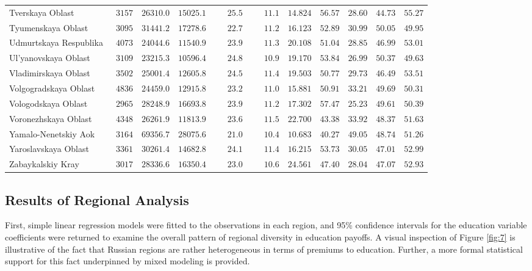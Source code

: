 \documentclass[12pt,a4paper]{article}
\numberwithin{equation}{section}
\begin{document}
{\begin{longtable}{lcccccccccc}
		Tverskaya Oblast  & $\phantom{0}3157$ & $26310.0$ & $15025.1$ & $\phantom{000}25.5$ & $\phantom{000}11.1$ & $14.824$ & $56.57$ & $28.60$ & $44.73$ & $55.27$ \\
		Tyumenskaya Oblast  & $\phantom{0}3095$ & $31441.2$ & $17278.6$ & $\phantom{000}22.7$ & $\phantom{000}11.2$ & $16.123$ & $52.89$ & $30.99$ & $50.05$ & $49.95$ \\
		Udmurtskaya Respublika  & $\phantom{0}4073$ & $24044.6$ & $11540.9$ & $\phantom{000}23.9$ & $\phantom{000}11.3$ & $20.108$ & $51.04$ & $28.85$ & $46.99$ & $53.01$ \\
		Ul'yanovskaya Oblast  & $\phantom{0}3109$ & $23215.3$ & $10596.4$ & $\phantom{000}24.8$ & $\phantom{000}10.9$ & $19.170$ & $53.84$ & $26.99$ & $50.37$ & $49.63$ \\
		Vladimirskaya Oblast  & $\phantom{0}3502$ & $25001.4$ & $12605.8$ & $\phantom{000}24.5$ & $\phantom{000}11.4$ & $19.503$ & $50.77$ & $29.73$ & $46.49$ & $53.51$ \\
		Volgogradskaya Oblast  & $\phantom{0}4836$ & $24459.0$ & $12915.8$ & $\phantom{000}23.2$ & $\phantom{000}11.0$ & $15.881$ & $50.91$ & $33.21$ & $49.69$ & $50.31$ \\
		Vologodskaya Oblast  & $\phantom{0}2965$ & $28248.9$ & $16693.8$ & $\phantom{000}23.9$ & $\phantom{000}11.2$ & $17.302$ & $57.47$ & $25.23$ & $49.61$ & $50.39$ \\
		Voronezhskaya Oblast  & $\phantom{0}4348$ & $26261.9$ & $11813.9$ & $\phantom{000}23.6$ & $\phantom{000}11.5$ & $22.700$ & $43.38$ & $33.92$ & $48.37$ & $51.63$ \\
		Yamalo-Nenetskiy Aok  & $\phantom{0}3164$ & $69356.7$ & $28075.6$ & $\phantom{000}21.0$ & $\phantom{000}10.4$ & $10.683$ & $40.27$ & $49.05$ & $48.74$ & $51.26$ \\
		Yaroslavskaya Oblast  & $\phantom{0}3361$ & $30261.4$ & $14682.8$ & $\phantom{000}24.1$ & $\phantom{000}11.4$ & $16.215$ & $53.73$ & $30.05$ & $47.01$ & $52.99$ \\
		Zabaykalskiy Kray  & $\phantom{0}3017$ & $28336.6$ & $16350.4$ & $\phantom{000}23.0$ & $\phantom{000}10.6$ & $24.561$ & $47.40$ & $28.04$ & $47.07$ & $52.93$ \\
		\hline 
	\end{longtable}
}

\subsection{Results of Regional Analysis}
First, simple linear regression models were fitted to the observations in each region, and 95\% confidence intervals for the education variable coefficients were returned to examine the overall pattern of regional diversity in education payoffs. A visual inspection of Figure \ref{fig:7} is illustrative of the fact that Russian regions are rather heterogeneous in terms of premiums to education. Further, a more formal statistical support for this fact underpinned by mixed modeling is provided.
\end{document}
